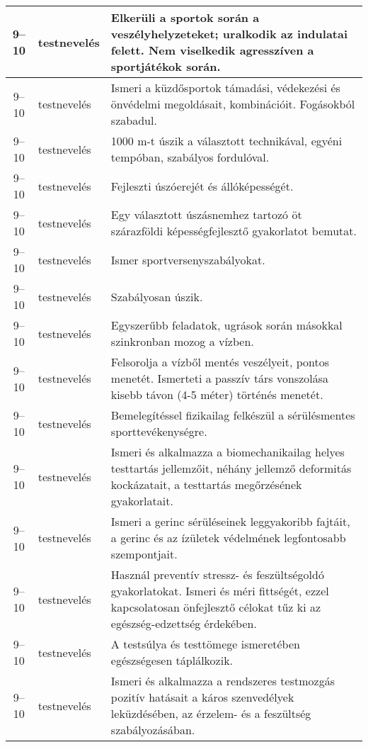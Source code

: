 \begin{small}
\begin{longtable}{c | p{2cm} |  p{11cm} }
              9--10 & testnevelés & Elkerüli a sportok során a veszélyhelyzeteket; uralkodik az indulatai felett. Nem viselkedik agresszíven a sportjátékok során. \\ \hline
              9--10 & testnevelés & Ismeri a küzdősportok támadási, védekezési és önvédelmi megoldásait, kombinációit. Fogásokból szabadul. \\ \hline
              9--10 & testnevelés & 1000 m-t  úszik a választott technikával, egyéni tempóban, szabályos fordulóval. \\ \hline
              9--10 & testnevelés & Fejleszti úszóerejét és állóképességét. \\ \hline
              9--10 & testnevelés & Egy választott úszásnemhez tartozó öt szárazföldi képességfejlesztő gyakorlatot bemutat. \\ \hline
              9--10 & testnevelés & Ismer sportversenyszabályokat. \\ \hline
              9--10 & testnevelés & Szabályosan úszik. \\ \hline
              9--10 & testnevelés & Egyszerűbb feladatok, ugrások során másokkal szinkronban mozog a vízben. \\ \hline
              9--10 & testnevelés & Felsorolja a vízből mentés veszélyeit, pontos menetét. Ismerteti a passzív társ vonszolása kisebb távon (4-5 méter) történés menetét. \\ \hline
              9--10 & testnevelés & Bemelegítéssel fizikailag felkészül a sérülésmentes sporttevékenységre. \\ \hline
              9--10 & testnevelés & Ismeri és alkalmazza a biomechanikailag helyes testtartás jellemzőit, néhány jellemző deformitás kockázatait, a testtartás megőrzésének gyakorlatait. \\ \hline
              9--10 & testnevelés & Ismeri a gerinc sérüléseinek leggyakoribb fajtáit, a gerinc és az ízületek védelmének legfontosabb szempontjait. \\ \hline
              9--10 & testnevelés & Használ preventív stressz- és feszültségoldó gyakorlatokat. Ismeri és méri fittségét, ezzel kapcsolatosan önfejlesztő célokat tűz ki az egészség-edzettség érdekében. \\ \hline
              9--10 & testnevelés & A testsúlya és testtömege ismeretében egészségesen táplálkozik. \\ \hline
              9--10 & testnevelés & Ismeri és alkalmazza a rendszeres testmozgás pozitív hatásait a káros szenvedélyek leküzdésében, az érzelem- és a feszültség szabályozásában. \\ \hline

\end{longtable}
\end{small}
